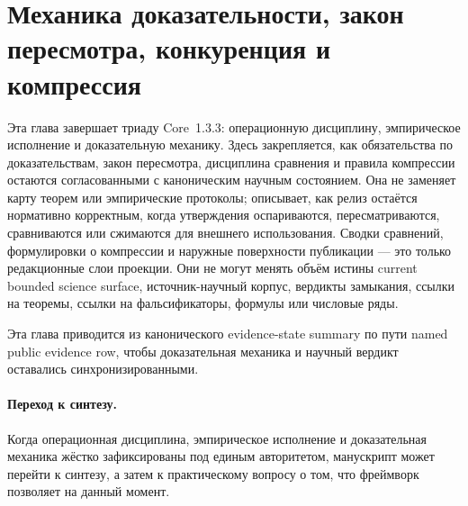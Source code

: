 \section{Механика доказательности, закон пересмотра, конкуренция и компрессия}
\label{sec:oc-core-1-3-proof-machinery}

Эта глава завершает триаду Core~1.3.3: операционную дисциплину, эмпирическое
исполнение и доказательную механику. Здесь закрепляется, как обязательства
по доказательствам, закон пересмотра, дисциплина сравнения и правила
компрессии остаются согласованными с каноническим научным состоянием.
Она не заменяет карту теорем или эмпирические протоколы; описывает, как
релиз остаётся нормативно корректным, когда утверждения оспариваются,
пересматриваются, сравниваются или сжимаются для внешнего использования.
Сводки сравнений, формулировки о компрессии и наружные поверхности
публикации — это только редакционные слои проекции. Они не могут менять
объём истины current bounded science surface, источник-научный корпус,
вердикты замыкания, ссылки на теоремы, ссылки на фальсификаторы,
формулы или числовые ряды.

Эта глава приводится из канонического evidence-state summary
 по пути
named public evidence row,
чтобы доказательная механика и научный вердикт оставались синхронизированными.



\paragraph{Переход к синтезу.}
Когда операционная дисциплина, эмпирическое исполнение и доказательная
механика жёстко зафиксированы под единым авторитетом, манускрипт может
перейти к синтезу, а затем к практическому вопросу о том, что фреймворк
позволяет на данный момент.
